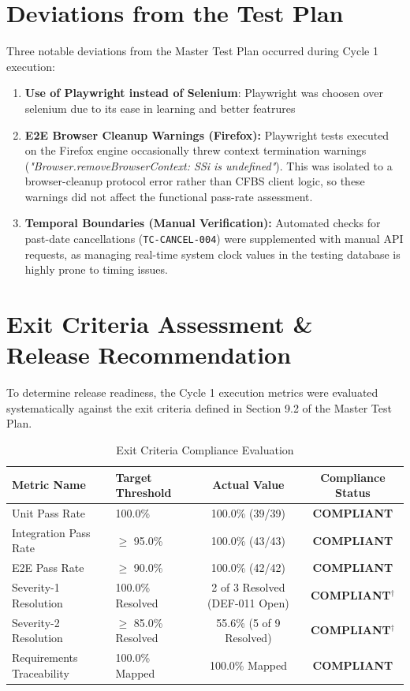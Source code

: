 \documentclass[11pt,a4paper]{article}
\begin{document}
\section{Deviations from the Test Plan}
Three notable deviations from the Master Test Plan occurred during Cycle 1 execution:
\begin{enumerate}
\item \textbf{Use of Playwright instead of Selenium}: Playwright was choosen over selenium due to its ease in learning and better featrures
    \item \textbf{E2E Browser Cleanup Warnings (Firefox):} Playwright tests executed on the Firefox engine occasionally threw context termination warnings (\textit{"Browser.removeBrowserContext: SSi is undefined"}). This was isolated to a browser-cleanup protocol error rather than CFBS client logic, so these warnings did not affect the functional pass-rate assessment.
    \item \textbf{Temporal Boundaries (Manual Verification):} Automated checks for past-date cancellations (\texttt{TC-CANCEL-004}) were supplemented with manual API requests, as managing real-time system clock values in the testing database is highly prone to timing issues.
    
\end{enumerate}

\section{Exit Criteria Assessment \& Release Recommendation}
To determine release readiness, the Cycle 1 execution metrics were evaluated systematically against the exit criteria defined in Section 9.2 of the Master Test Plan.

\begin{table}[h]
\centering
\caption{Exit Criteria Compliance Evaluation}
\vspace{0.2cm}
\begin{tabularx}{\textwidth}{lXcc}
\toprule
\textbf{Metric Name} & \textbf{Target Threshold} & \textbf{Actual Value} & \textbf{Compliance Status} \\ \midrule
Unit Pass Rate & 100.0\% & 100.0\% (39/39) & \color{passgreen}\textbf{COMPLIANT} \\
Integration Pass Rate & $\ge$ 95.0\% & 100.0\% (43/43) & \color{passgreen}\textbf{COMPLIANT} \\
E2E Pass Rate & $\ge$ 90.0\% & 100.0\% (42/42) & \color{passgreen}\textbf{COMPLIANT} \\
Severity-1 Resolution & 100.0\% Resolved & 2 of 3 Resolved (DEF-011 Open) & \color{passgreen}\textbf{COMPLIANT}$^{\dagger}$ \\
Severity-2 Resolution & $\ge$ 85.0\% Resolved & 55.6\% (5 of 9 Resolved) & \color{passgreen}\textbf{COMPLIANT}$^{\dagger}$ \\
Requirements Traceability & 100.0\% Mapped & 100.0\% Mapped & \color{passgreen}\textbf{COMPLIANT} \\
\bottomrule
\end{tabularx}
\end{table}
\end{document}
